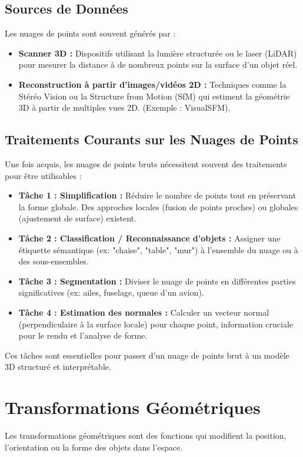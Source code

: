 \documentclass{article}
\begin{document}
\subsection{Sources de Données}
Les nuages de points sont souvent générés par :
\begin{itemize}
    \item \textbf{Scanner 3D :} Dispositifs utilisant la lumière structurée ou le laser (LiDAR) pour mesurer la distance à de nombreux points sur la surface d'un objet réel.
    \item \textbf{Reconstruction à partir d'images/vidéos 2D :} Techniques comme la Stéréo Vision ou la Structure from Motion (SfM) qui estiment la géométrie 3D à partir de multiples vues 2D. (Exemple : VisualSFM).
\end{itemize}

\subsection{Traitements Courants sur les Nuages de Points}
Une fois acquis, les nuages de points bruts nécessitent souvent des traitements pour être utilisables :
\begin{itemize}
    \item \textbf{Tâche 1 : Simplification :} Réduire le nombre de points tout en préservant la forme globale. Des approches locales (fusion de points proches) ou globales (ajustement de surface) existent.
    \item \textbf{Tâche 2 : Classification / Reconnaissance d'objets :} Assigner une étiquette sémantique (ex: "chaise", "table", "mur") à l'ensemble du nuage ou à des sous-ensembles.
    \item \textbf{Tâche 3 : Segmentation :} Diviser le nuage de points en différentes parties significatives (ex: ailes, fuselage, queue d'un avion).
    \item \textbf{Tâche 4 : Estimation des normales :} Calculer un vecteur normal (perpendiculaire à la surface locale) pour chaque point, information cruciale pour le rendu et l'analyse de forme.
\end{itemize}
Ces tâches sont essentielles pour passer d'un nuage de points brut à un modèle 3D structuré et interprétable.

\section{Transformations Géométriques}

Les transformations géométriques sont des fonctions qui modifient la position, l'orientation ou la forme des objets dans l'espace.
\end{document}
